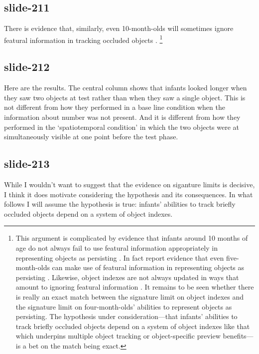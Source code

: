 \documentclass[12pt,\papersize]{extarticle}
\begin{document}
\subsection{slide-211}
There is evidence that, similarly, even 10-month-olds will sometimes
ignore featural information in tracking occluded objects
\citep{xu:1996_infants}.%
\footnote{
This argument is complicated by evidence that infants around 10 months of age do not always fail to use featural information appropriately in representing objects as persisting \citep{wilcox:2002_infants}.
In fact \citet{mccurry:2009_beyond} report evidence that even five-month-olds can make use of featural information in representing objects as persisting \citep[see also][]{wilcox:1999_object}.
Likewise, object indexes are not always updated in ways that amount to ignoring featural information \citep{hollingworth:2009_object,moore:2010_features}.
It remains to be seen whether there is really an exact match between the signature limit on object indexes and the signature limit on four-month-olds’ abilities to represent objects as persisting.
The hypothesis under consideration---that infants’ abilities
to track briefly occluded objects depend on a system of
object indexes like that which underpins multiple object tracking or
object-specific preview benefits---is a bet on the match being exact.
}

\subsection{slide-212}
Here are the results.
The central column shows that infants looked longer when they saw
two objects at test rather than when they saw a single object.
This is not different from how they performed in a base line condition
when the information about number was not present.
And it is different from how they performed in the ‘spatiotemporal
condition’ in which the two objects were at simultaneously
visible at one point before the test phase.

\subsection{slide-213}
While I wouldn’t want to suggest that the evidence on
siganture limits is
decisive, I think it does motivate considering the hypothesis and its
consequences.
In what follows I will assume the hypothesis is true:
infants’ abilities
to track briefly occluded objects depend on a system of
object indexes.
\end{document}
